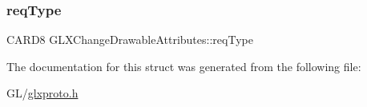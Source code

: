 \subsubsection{\texorpdfstring{req\+Type}{reqType}}
{\footnotesize\ttfamily C\+A\+R\+D8 G\+L\+X\+Change\+Drawable\+Attributes\+::req\+Type}



The documentation for this struct was generated from the following file\+:\begin{DoxyCompactItemize}
\item 
G\+L/\hyperlink{glxproto_8h}{glxproto.\+h}\end{DoxyCompactItemize}
